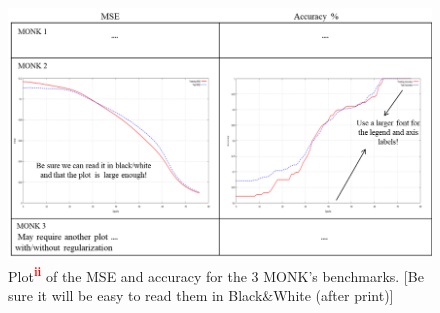 \documentclass[12pt, letterpaper]{article}  %
\begin{document}
\begin{figure}[h!]
\centering
\includegraphics[width=\textwidth]{monkplot.png}
\caption{Plot\textsuperscript{\textcolor{red}{\textbf{ii}}} of the MSE and accuracy for the 3 MONK’s benchmarks. [Be sure it will be easy to read them in Black\&White (after print)]}
\label{fig:monkplot}
\end{figure}

\newpage
\end{document}
